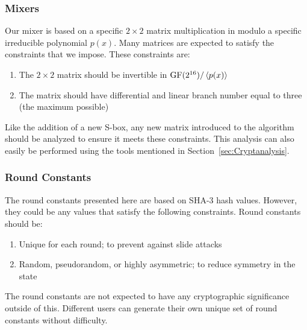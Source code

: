 \subsubsection{Mixers}
Our mixer is based on a specific $2 \times 2$ matrix multiplication in \gfsixteen modulo a specific irreducible polynomial $p(x)$.
Many matrices are expected to satisfy the constraints that we impose.
These constraints are:
\begin{enumerate}
\item The $2 \times 2$ matrix should be invertible in $\mathrm{GF}(2^{16}) /\left\langle p(x) \right\rangle$
\item The matrix should have differential and linear branch number equal to three (the maximum possible)
\end{enumerate}
Like the addition of a new S-box, any new matrix introduced to the algorithm should be analyzed to ensure it meets these constraints.
This analysis can also easily be performed using the tools mentioned in Section~\ref{sec:Cryptanalysis}.

\subsubsection{Round Constants}
The round constants presented here are based on SHA-3 hash values.
However, they could be any values that satisfy the following constraints.
Round constants should be:
\begin{enumerate}
\item Unique for each round; to prevent against slide attacks
\item Random, pseudorandom, or highly asymmetric; to reduce symmetry in the state
\end{enumerate}
The round constants are not expected to have any cryptographic significance outside of this.
Different users can generate their own unique set of round constants without difficulty.

